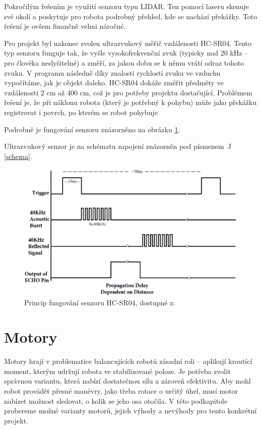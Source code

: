 Pokročilým řešením je využití senzoru typu LIDAR. Ten pomocí laseru skenuje své okolí a poskytuje pro robota podrobný přehled, kde se nachází překážky. Toto řešení je ovšem finančně velmi náročné.

Pro projekt byl nakonec zvolen ultrazvukový měřič vzdálenosti HC-SR04. Tento typ senzoru funguje tak, že vyšle vysokofrekvenční zvuk (typicky nad 20 kHz -- pro člověka neslyšitelné) a změří, za jakou dobu se k němu vrátí odraz tohoto zvuku. V programu následně díky znalosti rychlosti zvuku ve vzduchu vypočítáme, jak je objekt daleko. HC-SR04 dokáže změřit předměty ve vzdálenosti 2 cm až 400 cm, což je pro potřeby projektu dostačující. Problémem řešení je, že při náklonu robota (který je potřebný k pohybu) může jako překážku registrovat i povrch, po kterém se robot pohybuje.

Podrobně je fungování senzoru znázorněno na obrázku \ref{ultra_s}. 

Ultrazvukový senzor je na schématu zapojení znázorněn pod písmenem~J \ref{schema}.

\begin{figure}[H]
    \centering
    \includegraphics[width=0.8\linewidth]{obrazky-figures/us.png}
    \caption {Princip fungování senzoru HC-SR04, dostupné z: \cite{ultras}}
    \label{ultra_s}
\end{figure}

\section{Motory}
Motory hrají v problematice balancujících robotů zásadní roli -- aplikují kroutící moment, kterým udržují robota ve stabilizované poloze. Je potřeba zvolit správnou variantu, která nabízí dostatečnou sílu a zároveň efektivitu. Aby mohl robot provádět přesné manévry, jako třeba rotace o určitý úhel, musí motor nabízet možnost sledovat, o kolik se jeho osa otočila. V této podkapitole probereme možné varianty motorů, jejich výhody a nevýhody pro tento konkrétní projekt.

